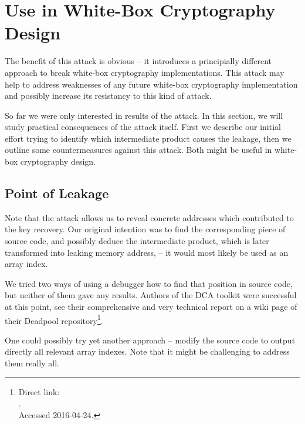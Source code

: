 \section{Use in White-Box Cryptography Design}
\label{sec:useindesign}

The benefit of this attack is obvious -- it introduces a principially different approach to break white-box cryptography implementations. This attack may help to address weaknesses of any future white-box cryptography implementation and possibly increase its resistancy to this kind of attack.

So far we were only interested in results of the attack. In this section, we will study practical consequences of the attack itself. First we describe our initial effort trying to identify which intermediate product causes the leakage, then we outline some countermeasures against this attack. Both might be useful in white-box cryptography design.



\subsection{Point of Leakage}

Note that the attack allows us to reveal concrete addresses which contributed to the key recovery. Our original intention was to find the corresponding piece of source code, and possibly deduce the intermediate product, which is later transformed into leaking memory address, -- it would most likely be used as an array index.

We tried two ways of using a debugger how to find that position in source code, but neither of them gave any results. Authors of the DCA toolkit \cite{bos2016tools} were successful at this point, see their comprehensive and very technical report on a wiki page of their Deadpool repository\footnote{Direct link:\\.\\Accessed 2016-04-24.}.

One could possibly try yet another approach -- modify the source code to output directly all relevant array indexes. Note that it might be challenging to address them really all.


